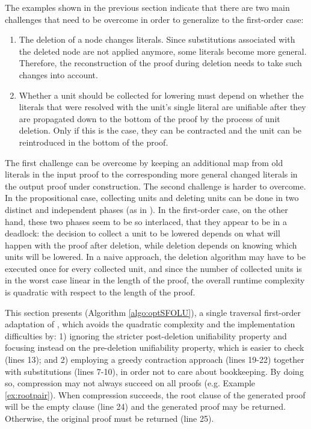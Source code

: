 The examples shown in the previous section indicate that there are two main challenges that need to be overcome in order to generalize \LowerUnits to the first-order case:
\begin{enumerate}
\item The deletion of a node changes literals. Since substitutions associated with the deleted node are not applied anymore, some literals become more general. Therefore, the reconstruction of the proof during deletion needs to take such changes into account.
\item Whether a unit should be collected for lowering must depend on whether the literals that were resolved with the unit's single literal are unifiable after they are propagated down to the bottom of the proof by the process of unit deletion. Only if this is the case, they can be contracted and the unit can be reintroduced in the bottom of the proof.
\end{enumerate}

The first challenge can be overcome by keeping an additional map from old literals in the input proof to the corresponding more general changed literals in the output proof under construction. The second challenge is harder to overcome. In the propositional case, collecting units and deleting units can be done in two distinct and independent phases (as in {\LowerUnits}). In the first-order case, on the other hand, these two phases seem to be so interlaced, that they appear to be in a deadlock: the decision to collect a unit to be lowered depends on what will happen with the proof after deletion, while deletion depends on knowing which units will be lowered. In a naive approach, the deletion algorithm may have to be executed once for every collected unit, and since the number of collected units is in the worst case linear in the length of the proof, the overall runtime complexity is quadratic with respect to the length of the proof. 

This section presents {\SFOLowerUnits} (Algorithm \ref{algo:optSFOLU}), a single traversal first-order adaptation of {\LowerUnits}, which avoids the quadratic complexity and the implementation difficulties by: 1) ignoring the stricter post-deletion unifiability property and focusing instead on the pre-deletion unifiability property, which is easier to check (lines 13); and 2) employing a greedy contraction approach (lines 19-22) together with substitutions (lines 7-10), in order not to care about bookkeeping. By doing so, compression may not always succeed on all proofs (e.g. Example \ref{ex:rootpair}). When compression succeeds, the root clause of the generated proof will be the empty clause (line 24) and the generated proof may be returned. Otherwise, the original proof must be returned (line 25).

